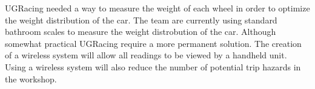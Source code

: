 UGRacing needed a way to measure the weight of each wheel in order to optimize the weight distribution of the car. The team are currently using standard bathroom scales to measure the weight distrobution of the car. Although somewhat practical UGRacing require a more permanent solution. The creation of a wireless system will allow all readings to be viewed by a handheld unit. Using a wireless system will also reduce the number of potential trip hazards in the workshop.


